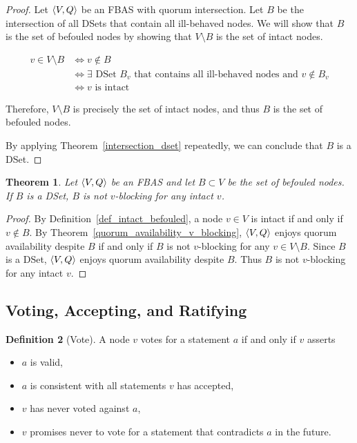 \documentclass[12pt, psamsfonts]{amsart}
\newtheorem{thm}{Theorem}[subsection]
\theoremstyle{definition}
\newtheorem{defn}[thm]{Definition}
\theoremstyle{remark}
\numberwithin{equation}{subsection}
\begin{document}
\begin{proof}
	Let $\ev{V, Q}$ be an FBAS with quorum intersection.
	Let $B$ be the intersection of all DSets that contain all ill-behaved nodes.
    We will show that $B$ is the set of befouled nodes by showing that $V \setminus B$ is the set of intact nodes.

    \begin{align*}
        v \in V \setminus B
            &\iff v \notin B \\
            &\iff \text{$\exists$ DSet $B_v$ that contains all ill-behaved nodes and $v \notin B_v$} \\
            &\iff \text{$v$ is intact}
    \end{align*}

	Therefore, $V \setminus B$ is precisely the set of intact nodes, and thus $B$ is the set of befouled nodes.

	By applying Theorem~\ref{intersection_dset} repeatedly, we can conclude that $B$ is a DSet.
\end{proof}

\begin{thm}\label{dset_v_blocking}
    Let $\ev{V, Q}$ be an FBAS and let $B \subset V$ be the set of befouled nodes.
    If $B$ is a DSet, $B$ is not $v$-blocking for any intact $v$.
\end{thm}

\begin{proof}
    By Definition~\ref{def_intact_befouled}, a node $v \in V$ is intact if and only if $v \notin B$.
    By Theorem~\ref{quorum_availability_v_blocking}, $\ev{V, Q}$ enjoys quorum availability despite $B$ if and only if $B$ is not $v$-blocking for any $v \in V \setminus B$.
    Since $B$ is a DSet, $\ev{V, Q}$ enjoys quorum availability despite $B$.
    Thus $B$ is not $v$-blocking for any intact $v$.
\end{proof}

\newpage
\subsection{Voting, Accepting, and Ratifying}

\begin{defn}[Vote]\label{def_vote}
    A node $v$ votes for a statement $a$ if and only if $v$ asserts
    \begin{itemize}
        \item
            $a$ is valid,
        \item
            $a$ is consistent with all statements $v$ has accepted,
        \item
            $v$ has never voted against $a$,
        \item
            $v$ promises never to vote for a statement that contradicts $a$ in the future.
    \end{itemize}
\end{defn}
\end{document}

